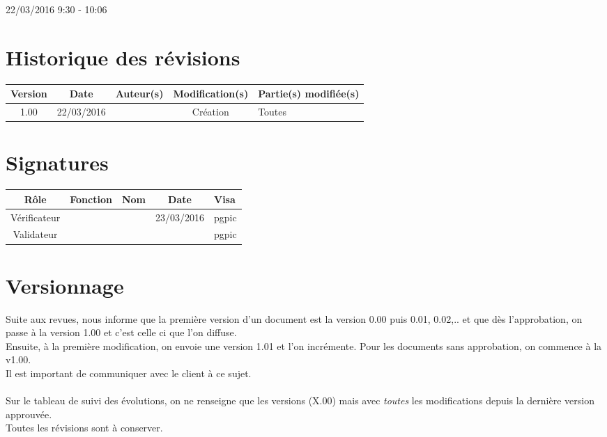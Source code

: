 \documentclass [a4paper] {article}
\begin{document}
\rhead{}

22/03/2016
\hfill   
\hfill 	9:30 - 10:06 				%



\section*{Historique des révisions}
\begin{center}
			\begin{tabular}{| c | c | c | c | p{4cm} |}
				\hline
				\rowcolor{Gray}
				Version & Date & Auteur(s) & Modification(s) & Partie(s) modifiée(s)		 \\
				\hline
				1.00 & 22/03/2016 & \Pierre & Création & Toutes \\
		\hline		
			\end{tabular}
		\end{center}

\section*{Signatures}

		\begin{center}
			\begin{tabular}{| c | c | c | c | p{4cm} |}
				\hline
				\rowcolor{Gray}
				Rôle & Fonction & Nom & Date & Visa		 \\
				\hline
				Vérificateur & \RQA & \Kafui & 23/03/2016 & pgpic \\[30pt]
				\hline
				Validateur & \CP & \Sergi &  & pgpic \\[30pt]	
				\hline
			\end{tabular}
		\end{center}


\section{Versionnage}
Suite aux revues, \nomTuteurQualite{} nous informe que la première version d'un document est la version 0.00 puis 0.01, 0.02,.. et que dès l'approbation, on passe à la version 1.00 et c'est celle ci que l'on diffuse. \\
Ensuite, à la première modification, on envoie une version 1.01 et l'on incrémente. Pour les documents sans approbation, on commence à la v1.00. \\
Il est important de communiquer avec le client à ce sujet. \\ ~ \\
Sur le tableau de suivi des évolutions, on ne renseigne que les versions (X.00) mais avec \emph{toutes} les modifications depuis la dernière version approuvée.\\
Toutes les révisions sont à conserver.
\end{document}
